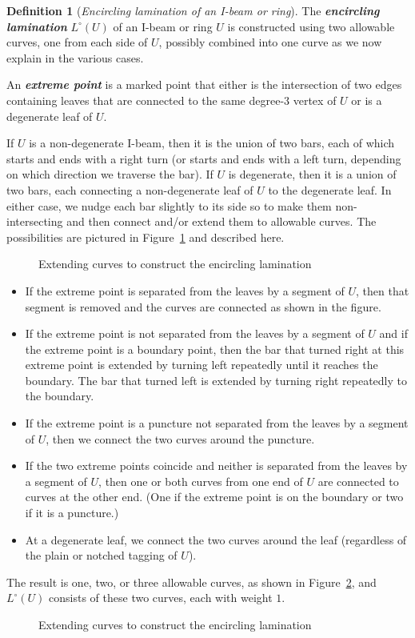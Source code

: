 \documentclass{amsart}
\theoremstyle{definition}
\newtheorem{definition}[proposition]{Definition}
\theoremstyle{remark}
\numberwithin{equation}{section}
\newcommand{\newword}[1]{\textbf{\emph{#1}}}
\newcommand{\0}{{\mathbf{0}}}
\begin{document}
\begin{definition}[\emph{Encircling lamination of an I-beam or ring}]\label{encirc def}
The \newword{encircling lamination} $L^\circ(U)$ of an I-beam or ring $U$ is constructed using two allowable curves, one from each side of $U$, possibly combined into one curve as we now explain in the various cases.

An \newword{extreme point} is a marked point that either is the intersection of two edges containing leaves that are connected to the same degree-$3$ vertex of $U$ or is a degenerate leaf of $U$.

If $U$ is a non-degenerate I-beam, then  it is the union of two bars, each of which starts and ends with a right turn (or starts and ends with a left turn, depending on which direction we traverse the bar).
If $U$ is degenerate, then it is a union of two bars, each connecting a non-degenerate leaf of $U$ to the degenerate leaf.
In either case, we nudge each bar slightly to its side so to make them non-intersecting and then connect and/or extend them to allowable curves.
The possibilities are pictured in Figure~\ref{extend fig} and described here.
\begin{figure}
\caption{Extending curves to construct the encircling lamination}
\label{extend fig}
\end{figure}
\begin{itemize}
\item
If the extreme point is separated from the leaves by a segment of $U$, then that segment is removed and the curves are connected as shown in the figure.
\item
If the extreme point is not separated from the leaves by a segment of $U$ and if the extreme point is a boundary point, then the bar that turned right at this extreme point is extended by turning left repeatedly until it reaches the boundary.
The bar that turned left is extended by turning right repeatedly to the boundary.
\item
If the extreme point is a puncture not separated from the leaves by a segment of $U$, then we connect the two curves around the puncture.
\item
If the two extreme points coincide and neither is separated from the leaves by a segment of $U$, then one or both curves from one end of $U$ are connected to curves at the other end.
(One if the extreme point is on the boundary or two if it is a puncture.)
\item
At a degenerate leaf, we connect the two curves around the leaf (regardless of the plain or notched tagging of $U$).  
\end{itemize}
The result is one, two, or three allowable curves, as shown in Figure~\ref{encirc fig}, and $L^\circ(U)$ consists of these two curves, each with weight $1$.
\begin{figure}
\caption{Extending curves to construct the encircling lamination}
\label{encirc fig}
\end{figure}


\end{definition}
\end{document}
